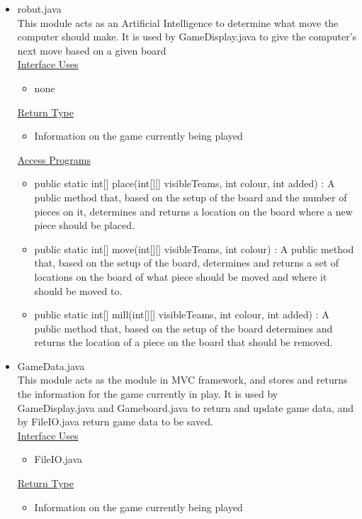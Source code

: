 \documentclass[12pt]{article}
\begin{document}
\begin{itemize}
				\item robut.java \\
				This module acts as an Artificial Intelligence to determine what move the computer should make. It is used by GameDisplay.java to give the computer’s next move based on a given board  \\
				\underline{Interface Uses} 
				\begin{itemize}
					\item none
				\end{itemize} 
				\underline{Return Type}
				\begin{itemize}
					\item Information on the game currently being played
				\end{itemize}
				\underline{Access Programs}
				\begin{itemize}
					\item public static int[] place(int[][] visibleTeams, int colour, int added) : A public method that, based on the setup of the board and the number of pieces on it, determines and returns a location on the board where a new piece should be placed.
					\item public static int[] move(int[][] visibleTeams, int colour) : A public method that, based on the setup of the board, determines and returns a set of locations on the board of what piece should be moved and where it should be moved to.
					\item public static int[] mill(int[][] visibleTeams, int colour, int added) : A public method that, based on the setup of the board determines and returns the location of a piece on the board that should be removed.
				\end{itemize}
				\item GameData.java \\
				This module acts as the module in MVC framework, and stores and returns the information for the game currently in play. It is used by GameDisplay.java and Gameboard.java to return and update game data, and by FileIO.java return game data to be saved. \\
				\underline{Interface Uses} 
				\begin{itemize}
					\item FileIO.java
				\end{itemize} 
				\underline{Return Type}
				\begin{itemize}
					\item Information on the game currently being played
				\end{itemize}

\end{itemize}
\end{document}

